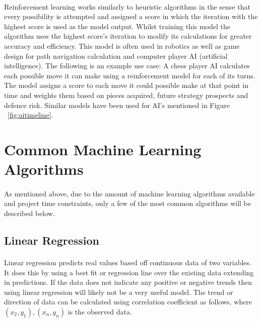 \paragraph{}Reinforcement learning works similarly to heuristic algorithms in the sense that every possibility is attempted and assigned a score in which the iteration with the highest score is used as the model output. Whilst training this model the algorithm uses the highest score’s iteration to modify its calculations for greater accuracy and efficiency. This model is often used in robotics as well as game design for path navigation calculation and computer player AI (artificial intelligence). The following is an example use case: A chess player AI calculates each possible move it can make using a reinforcement model for each of its turns. The model assigns a score to each move it could possible make at that point in time and weights them based on pieces acquired, future strategy prospects and defence risk.
Similar models have been used for AI’s mentioned in Figure ~\ref{fig:aitimeline}.


\section{Common Machine Learning Algorithms}
\label{sec:section6}

\paragraph{}As mentioned above, due to the amount of machine learning algorithms available and project time constraints, only a few of the most common algorithms will be described below.
\subsection{Linear Regression} 
\paragraph{}Linear regression predicts real values based off continuous data of two variables. It does this by using a best fit or regression line over the existing data extending in predictions. If the data does not indicate any positive or negative trends then using linear regression will likely not be a very useful model. The trend or direction of data can be calculated using correlation coefficient as follows, where $\left( {{x_2},{y_1}} \right),\left( {{x_n},{y_n}} \right)$ is the observed data.

